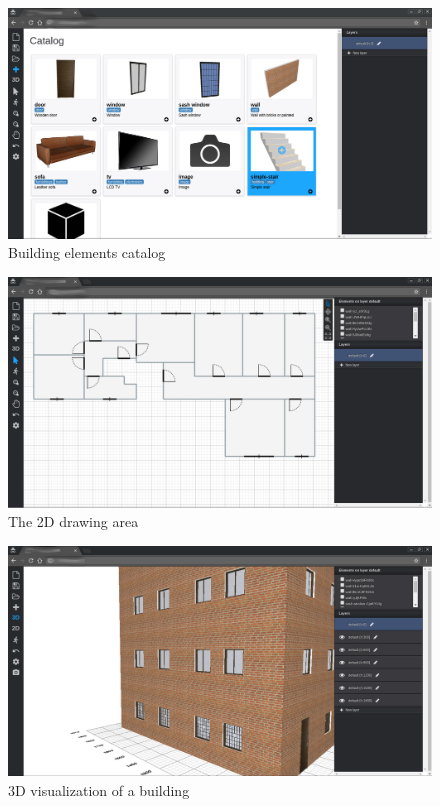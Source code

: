 \begin{figure}[htb]
\centering
\includegraphics[width=\linewidth]{contents/images/figcatalog}
\caption{Building elements catalog}
\label{figCatalogo}
\end{figure}

\begin{figure}[htb]
\centering
\includegraphics[width=\linewidth]{contents/images/fig-pianta}
\caption{The 2D drawing area}
\label{fig2D}
\end{figure}

\begin{figure}[htb]
\centering
\includegraphics[width=\linewidth]{contents/images/palazzo2}
\caption{3D visualization of a building}
\label{fig3D-palace}
\end{figure}

